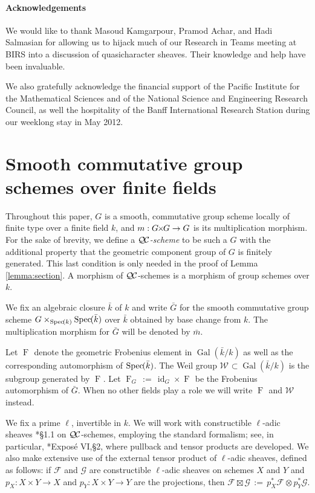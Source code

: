 \documentclass[11pt]{amsart}
\theoremstyle{plain}
\theoremstyle{definition}
\theoremstyle{remark}
\newcommand{\Spec}[1]{{\operatorname{Spec}\hskip-1pt( #1 )}}
\newcommand{\bFq}{\bar{k}}
\newcommand{\Fq}{k}
\DeclareMathOperator{\Gal}{Gal}
\newcommand{\Frob}[1]{\operatorname{F}_{#1}}
\DeclareMathOperator{\id}{id}
\newcommand{\ceq}{{\, :=\, }}
\newcommand{\QC}{{\mathcal{Q\hskip-0.8pt C}}}
\newcommand{\Weil}[1]{\mathcal{W}_{#1}}
\newcommand{\bm}{\bar{m}}
\newcommand{\bG}{\bar{G}}
\newcommand{\tight}[3]{\hspace{-#1pt}{#2}\hspace{-#3pt}}
\newcommand{\GxG}{\text{$G \tight{1}{\times}{1} G$}}
\begin{document}
\subsection*{Acknowledgements}

We would like to thank Masoud Kamgarpour, Pramod Achar, and Hadi Salmasian
for allowing us to hijack much of our Research in Teams meeting at BIRS into a discussion of
quasicharacter sheaves.  Their knowledge and help have been invaluable.

We also gratefully acknowledge the financial support of the Pacific Institute for the Mathematical Sciences
and of the National Science and Engineering Research Council,
as well the hospitality of the Banff International Research Station during our weeklong stay in May 2012.

\tableofcontents

\part{Smooth commutative group schemes over finite fields} \label{part1}

Throughout this paper, $G$ is a smooth, commutative group scheme locally of finite type
over a finite field $\Fq$, and $m : \GxG\to G$ is its multiplication morphism.  For the sake of brevity, we
define a \emph{$\QC$-scheme} to be such a $G$ with the additional property that the
geometric component group of $G$ is finitely generated.  This last condition is only
needed in the proof of Lemma \ref{lemma:section}.  A morphism of $\QC$-schemes is a morphism
of group schemes over $\Fq$.

We fix an algebraic closure $\bFq$ of $\Fq$ and write $\bG$ for the
smooth commutative group scheme $G \times_{\Spec{\Fq}} \Spec{\bFq}$ over $\bFq$
obtained by base change from $k$. The multiplication morphism for $\bG$ will be denoted by $\bm$. 

Let $\Frob{}$ denote the geometric Frobenius element in $\Gal(\bFq/\Fq)$ as
well as the corresponding automorphism of $\Spec{\bFq}$. The Weil group
$\Weil{}\subset \Gal(\bFq/\Fq)$ is the subgroup generated by $\Frob{}$.
Let $\Frob{G} \ceq \id_{G} \times \Frob{}$ be the Frobenius automorphism of $\bG$.
When no other fields play a role we will write $\Frob{}$ and $\Weil{}$ instead.

We fix a prime $\ell$, invertible in $\Fq$.
We will work with constructible $\ell$-adic sheaves \cite{deligne:80a}*{\S 1.1} on $\QC$-schemes,
employing the standard formalism;
see, in particular, \cite{SGA5}*{Expos\'e VI,\S 2}, where pullback and tensor products are developed.
We also make extensive use of the external tensor product of $\ell$-adic sheaves, defined as follows: if $\mathcal{F}$ and $\mathcal{G}$ are constructible $\ell$-adic sheaves on schemes $X$ and $Y$ and $p_X : X\times Y\to X$ and $p_Y : X\times Y \to Y$ are the projections, then $\mathcal{F}\boxtimes \mathcal{G} \ceq p_X^* \mathcal{F} \otimes p_Y^*\mathcal{G}$.
\end{document}
